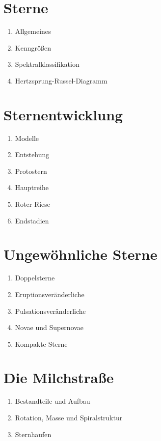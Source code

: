 \documentclass[a4paper,9pt]{article}
\begin{document}
\begin{multicols}{3}
    \section{Sterne} %
    \label{sec:sterne}
      \begin{enumerate}
        \item Allgemeines
        \item Kenngrößen
        \item Spektralklassifikation
        \item Hertzsprung-Russel-Diagramm
      \end{enumerate}

    \section{Sternentwicklung} %
    \label{sec:sternentwicklung}
      \begin{enumerate}
        \item Modelle
        \item Entstehung
        \item Protostern
        \item Hauptreihe
        \item Roter Riese
        \item Endstadien
      \end{enumerate}

    \section{Ungewöhnliche Sterne} %
    \label{sec:ungewöhnliche_sterne}
      \begin{enumerate}
        \item Doppelsterne
        \item Eruptionsveränderliche
        \item Pulsationsveränderliche
        \item Novae und Supernovae
        \item Kompakte Sterne
      \end{enumerate}

    \section{Die Milchstraße} %
    \label{sec:die_milchstrasse}
      \begin{enumerate}
        \item Bestandteile und Aufbau
        \item Rotation, Masse und Spiralstruktur
        \item Sternhaufen
      \end{enumerate}


\end{multicols}
\end{document}
